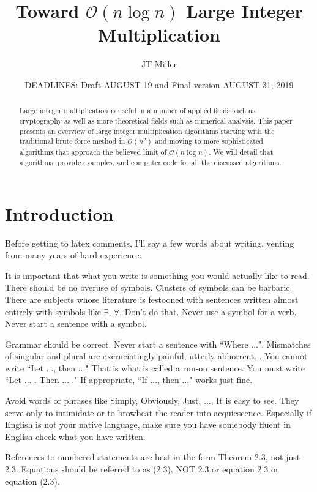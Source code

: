 \documentclass[psamsfonts]{amsart}
\title{Toward $\mathcal{O}(n\log{}n)$ Large Integer Multiplication}
\author{JT Miller}
\date{DEADLINES: Draft AUGUST 19 and Final version AUGUST 31, 2019}
\theoremstyle{definition}
\theoremstyle{remark}
\numberwithin{equation}{section}
\begin{document}
\begin{abstract}

Large integer multiplication is useful in a number of applied fields such as cryptography as well as more theoretical fields such as numerical analysis. This paper presents an overview of large integer multiplication algorithms starting with the traditional brute force method in $\mathcal{O}(n^2)$ and moving to more sophisticated algorithms that approach the believed limit of $\mathcal{O}(n\log{}n)$. We will detail that algorithms, provide examples, and computer code for all the discussed algorithms.

\end{abstract}

\maketitle

\tableofcontents

\section{Introduction}  

Before getting to latex comments, I'll say a few words about writing, venting from many years of hard experience. 

It is important that what you write is something you would actually like to read.  There should be no overuse of symbols.
Clusters of symbols can be barbaric.  There are subjects whose literature is festooned with sentences written almost entirely with symbols like $\exists$, $\forall$.  Don't do that. Never use a symbol for a verb.  Never start a sentence with a symbol.  

Grammar should be correct.  Never start a sentence with ``Where ...".   
Mismatches of singular and plural are excruciatingly painful, utterly abhorrent. . You cannot write
``Let ..., then ..."  That is what is called a run-on sentence. You must write ``Let ... .  Then ... ."
If appropriate, ``If ..., then ..."  works just fine.

Avoid words or phrases like Simply, Obviously, Just, ..., It is easy to see.  They serve only to intimidate or to browbeat the reader into acquiescence. 
Especially if English is not your native language, make sure you have  somebody fluent in English check what you have written.     

References to numbered statements are best in the form Theorem 2.3, not just 2.3.
Equations should be referred to as (2.3), NOT 2.3 or equation 2.3 or equation (2.3).
\end{document}
